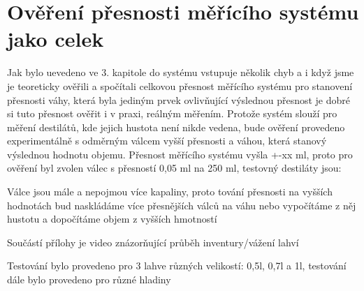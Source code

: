 

\section{Ověření přesnosti měřícího systému jako celek}

Jak bylo uevedeno ve 3. kapitole do systému vstupuje několik chyb a i když jsme je teoreticky ověřili a spočítali celkovou přesnost měřícího systému pro stanovení přesnosti váhy, která byla jediným prvek ovlivňující výslednou přesnost je dobré si tuto přesnost ověřit i v praxi, reálným měřením. Protože systém slouží pro měření destilátů, kde jejich hustota není nikde vedena, bude ověření provedeno experimentálně s odměrným válcem vyšší přesnosti a váhou, která stanový výslednou hodnotu objemu. Přesnost měřícího systému vyšla +-xx ml, proto pro ověření byl zvolen válec s přesností 0,05 ml na 250 ml, testovný destiláty jsou:

Válce jsou mále a nepojmou více kapaliny, proto tování přesnosti na vyšších hodnotách bud naskládáme více přesnějších válců na váhu nebo vypočítáme z něj hustotu a dopočítáme objem z vyšších hmotností

Součástí přílohy je video znázorňující průběh inventury/vážení lahví

Testování bylo provedeno pro 3 lahve různých velikostí: 0,5l, 0,7l a 1l, testování dále bylo provedeno pro různé hladiny